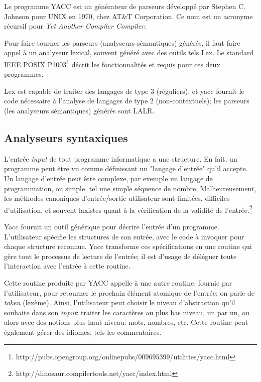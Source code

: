 \documentclass[a4paper,11pt,twoside,final]{article}
\begin{document}
  Le programme YACC est un générateur de parseurs développé par Stephen C.
  Johnson pour UNIX en 1970, chez AT\&T Corporation. Ce nom est un acronyme
  récursif pour \textit{Yet Another Compiler Compiler}.

  Pour faire tourner les parseurs (analyseurs sémantiques) générés, il faut
  faire appel à un analyseur lexical, souvent généré avec des outils tels Lex.
  Le standard IEEE POSIX P1003\footnote{%
  http://pubs.opengroup.org/onlinepubs/009695399/utilities/yacc.html} décrit
  les fonctionnalités et requis pour ces deux programmes.

  Lex est capable de traiter des langages de type 3 (réguliers), et yacc
  fournit le code nécessaire à l'analyse de langages de type 2
  (non-contextuels); les parseurs (les analyseurs sémantiques) générés sont
  LALR.

  \subsection{Analyseurs syntaxiques}

  L'entrée \textit{input} de tout programme informatique a une structure. En
  fait, un programme peut être vu comme définissant un "langage d'entrée" qu'il
  accepte. Un langage d'entrée peut être complexe, par exemple un langage de
  programmation, ou simple, tel une simple séquence de nombre. Malheureusement,
  les méthodes canoniques d'entrée/sortie utilisateur sont limitées, difficiles
  d'utilisation, et souvent laxistes quant à la vérification de la validité de
  l'entrée.\footnote{http://dinosaur.compilertools.net/yacc/index.html}

  Yacc fournit un outil générique pour décrire l'entrée d'un programme.
  L'utilisateur spécifie les structures de son entrée, avec le code à invoquer
  pour chaque structure reconnue. Yacc transforme ces spécifications en une
  routine qui gère tout le processus de lecture de l'entrée; il est
  d'usage de déléguer toute l'interaction avec l'entrée à cette routine.

  Cette routine produite par YACC appelle à une autre routine, fournie par
  l'utilisateur, pour retourner le prochain élément atomique de l'entrée; on
  parle de \textit{token} (lexème). Ainsi, l'utilisateur peut choisir le niveau
  d'abstraction qu'il souhaite dans son \textit{input}: traiter les caractères
  au plus bas niveau, un par un, ou alors avec des notions plus haut niveau:
  mots, nombres, etc. Cette routine peut également gérer des idiomes, tels les
  commentaires.
\end{document}
